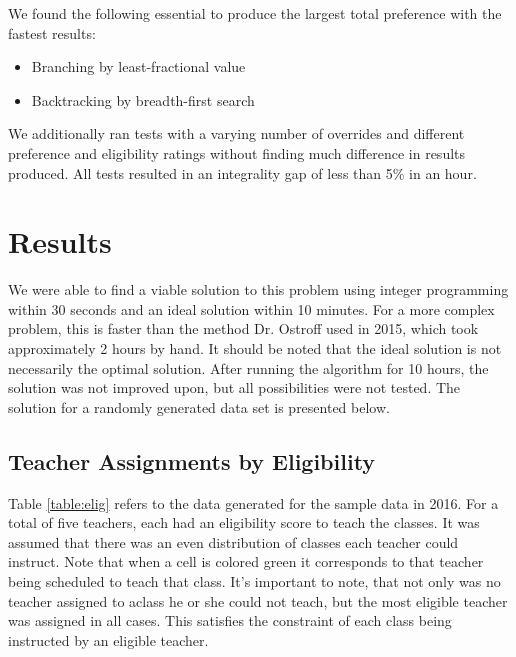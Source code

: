 \documentclass[11pt]{article}
\begin{document}
We found the following essential to produce the largest total preference with the fastest results:
\begin{itemize}
	\item Branching by least-fractional value
	\item Backtracking by breadth-first search
\end{itemize}
\indent We additionally ran tests with a varying number of overrides and different preference and eligibility ratings without finding much difference in results produced. All tests resulted in an integrality gap of less than 5\% in an hour.

\section{Results}
We were able to find a viable solution to this problem using integer programming within 30 seconds and an ideal solution within 10 minutes. For a more complex problem, this is faster than the method Dr. Ostroff used in 2015, which took approximately 2 hours by hand. It should be noted that the ideal solution is not necessarily the optimal solution. After running the algorithm for 10 hours, the solution was not improved upon, but all possibilities were not tested. The solution for a randomly generated data set is presented below.\\
	\subsection{Teacher Assignments by Eligibility}
Table \ref{table:elig} refers to the data generated for the sample data in 2016. For a total of five teachers, each had an eligibility score to teach the classes. It was assumed that there was an even distribution of classes each teacher could instruct. Note that when a cell is colored green it corresponds to that teacher being scheduled to teach that class. It's important to note, that not only was no teacher assigned to aclass he or she could not teach, but the most eligible teacher was assigned in all cases. This satisfies the constraint of each class being instructed by an eligible teacher.\\
\FloatBarrier
\end{document}
